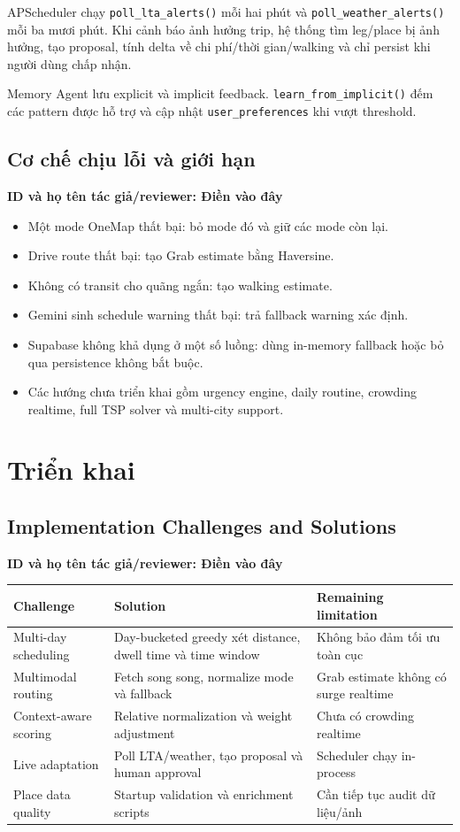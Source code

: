 \documentclass[12pt,a4paper]{article}
\newcommand{\tacgia}{%
  \begin{tcolorbox}[colback=blue!3,colframe=blue!25,boxrule=0.4pt,arc=1mm]
    \small\textbf{ID và họ tên tác giả/reviewer: Điền vào đây}
  \end{tcolorbox}
}
\begin{document}
APScheduler chạy \texttt{poll\_lta\_alerts()} mỗi hai phút và \texttt{poll\_weather\_alerts()} mỗi ba mươi phút. Khi cảnh báo ảnh hưởng trip, hệ thống tìm leg/place bị ảnh hưởng, tạo proposal, tính delta về chi phí/thời gian/walking và chỉ persist khi người dùng chấp nhận.

Memory Agent lưu explicit và implicit feedback. \texttt{learn\_from\_implicit()} đếm các pattern được hỗ trợ và cập nhật \texttt{user\_preferences} khi vượt threshold.

\subsection{Cơ chế chịu lỗi và giới hạn}
\tacgia

\begin{itemize}
    \item Một mode OneMap thất bại: bỏ mode đó và giữ các mode còn lại.
    \item Drive route thất bại: tạo Grab estimate bằng Haversine.
    \item Không có transit cho quãng ngắn: tạo walking estimate.
    \item Gemini sinh schedule warning thất bại: trả fallback warning xác định.
    \item Supabase không khả dụng ở một số luồng: dùng in-memory fallback hoặc bỏ qua persistence không bắt buộc.
    \item Các hướng chưa triển khai gồm urgency engine, daily routine, crowding realtime, full TSP solver và multi-city support.
\end{itemize}

\section{Triển khai}

\subsection{Implementation Challenges and Solutions}
\tacgia

\begin{longtable}{|L{3.2cm}|L{5.3cm}|L{5.5cm}|}
\hline
\textbf{Challenge} & \textbf{Solution} & \textbf{Remaining limitation} \\ \hline
\endhead
Multi-day scheduling & Day-bucketed greedy xét distance, dwell time và time window & Không bảo đảm tối ưu toàn cục \\ \hline
Multimodal routing & Fetch song song, normalize mode và fallback & Grab estimate không có surge realtime \\ \hline
Context-aware scoring & Relative normalization và weight adjustment & Chưa có crowding realtime \\ \hline
Live adaptation & Poll LTA/weather, tạo proposal và human approval & Scheduler chạy in-process \\ \hline
Place data quality & Startup validation và enrichment scripts & Cần tiếp tục audit dữ liệu/ảnh \\ \hline
\end{longtable}
\end{document}
